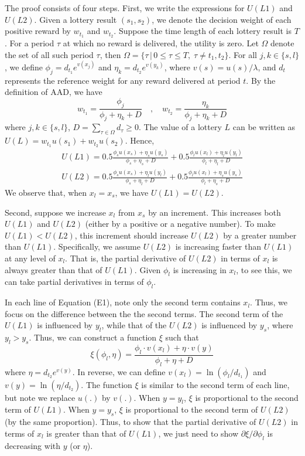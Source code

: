 \documentclass[
  12pt,
]{article}
\begin{document}
The proof consists of four steps. First, we write the expressions for
\(U(L1)\) and \(U(L2)\). Given a lottery result \((s_1,s_2)\), we denote
the decision weight of each positive reward by \(w_{t_1}\) and
\(w_{t_2}\). Suppose the time length of each lottery result is \(T\).
For a period \(\tau\) at which no reward is delivered, the utility is
zero. Let \(\Omega\) denote the set of all such period \(\tau\), then
\(\Omega=\{\tau\,|\,0\leq\tau\leq T,\;\tau \neq t_1,t_2\}\). For all
\(j,k\in\{s,l\}\), we define \(\phi_j=d_{t_1}e^{v(x_j)}\) and
\(\eta_k=d_{t_2}e^{v(y_k)}\), where \(v(s)=u(s)/\lambda\), and \(d_t\)
represents the reference weight for any reward delivered at period
\(t\). By the definition of AAD, we have\[
w_{t_1} = \frac{\phi_j}{\phi_j + \eta_k +D} \quad ,\quad
w_{t_2} = \frac{\eta_k}{\phi_j + \eta_k +D}
\]where \(j,k\in\{s,l\}\), \(D=\sum_{\tau\in\Omega} d_{\tau}\geq 0\).
The value of a lottery \(L\) can be written as
\(U(L)=w_{t_1}u(s_1)+w_{t_2}u(s_2)\). Hence, \[\tag{E1}
\begin{aligned}
U(L1)=0.5\frac{\phi_s u(x_s)+\eta_s u(y_s)}{\phi_s+\eta_s+D} + 0.5\frac{\phi_l u(x_l)+\eta_l u(y_l)}{\phi_l+\eta_l+D} \\
U(L2)=0.5\frac{\phi_s u(x_s)+\eta_l u(y_l)}{\phi_s+\eta_l+D} + 0.5\frac{\phi_l u(x_l)+\eta_s u(y_s)}{\phi_l+\eta_s+D}
\end{aligned}
\]We observe that, when \(x_l=x_s\), we have \(U(L1)=U(L2)\).

Second, suppose we increase \(x_l\) from \(x_s\) by an increment. This
increases both \(U(L1)\) and \(U(L2)\) (either by a positive or a
negative number). To make \(U(L1)<U(L2)\), this increment should
increase \(U(L2)\) by a greater number than \(U(L1)\). Specifically, we
assume \(U(L2)\) is increasing faster than \(U(L1)\) at any level of
\(x_l\). That is, the partial derivative of \(U(L2)\) in terms of
\(x_l\) is always greater than that of \(U(L1)\). Given \(\phi_l\) is
increasing in \(x_l\), to see this, we can take partial derivatives in
terms of \(\phi_l\).

In each line of Equation (E1), note only the second term contains
\(x_l\). Thus, we focus on the difference between the the second terms.
The second term of the \(U(L1)\) is influenced by \(y_l\), while that of
the \(U(L2)\) is influenced by \(y_s\), where \(y_l>y_s\). Thus, we can
construct a function \(\xi\) such that\[
\xi(\phi_l,\eta) = \frac{\phi_l \cdot v(x_l)+\eta\cdot v(y)}{\phi_l+\eta+D}
\]where \(\eta=d_{t_2}e^{v(y)}\). In reverse, we can define
\(v(x_l)=\ln(\phi_l/d_{t_1})\) and \(v(y)=\ln(\eta/d_{t_2})\). The
function \(\xi\) is similar to the second term of each line, but note we
replace \(u(.)\) by \(v(.)\). When \(y=y_l\), \(\xi\) is proportional to
the second term of \(U(L1)\). When \(y=y_s\), \(\xi\) is proportional to
the second term of \(U(L2)\) (by the same proportion). Thus, to show
that the partial derivative of \(U(L2)\) in terms of \(x_l\) is greater
than that of \(U(L1)\), we just need to show
\(\partial \xi/\partial \phi_l\) is decreasing with \(y\) (or \(\eta\)).
\end{document}
